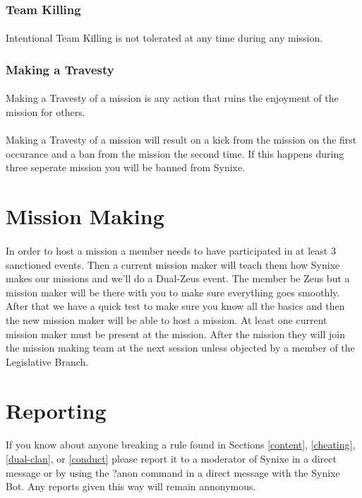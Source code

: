 \documentclass[10pt,a4paper]{article}
\begin{document}
\subsubsection{Team Killing}
\paragraph{}
Intentional Team Killing is not tolerated at any time during any mission.
\subsubsection{Making a Travesty}
\paragraph{}
Making a Travesty of a mission is any action that ruins the enjoyment of the mission for others.
\paragraph{}
Making a Travesty of a mission will result on a kick from the mission on the first occurance and a ban from the mission the second time. If this happens during three seperate mission you will be banned from Synixe.
\section{Mission Making}
\paragraph{}
In order to host a mission a member needs to have participated in at least 3 sanctioned events. Then a current mission maker will teach them how Synixe makes our missions and we'll do a Dual-Zeus event. The member be Zeus but a mission maker will be there with you to make sure everything goes smoothly. After that we have a quick test to make sure you know all the basics and then the new mission maker will be able to host a mission. At least one current mission maker must be present at the mission. After the mission they will join the mission making team at the next session unless objected by a member of the Legislative Branch.
\section{Reporting}
\paragraph{}
If you know about anyone breaking a rule found in Sections \ref{content}, \ref{cheating}, \ref{dual-clan}, or \ref{conduct} please report it to a moderator of Synixe in a direct message or by using the ?anon command in a direct message with the Synixe Bot. Any reports given this way will remain annonymous.
\end{document}
